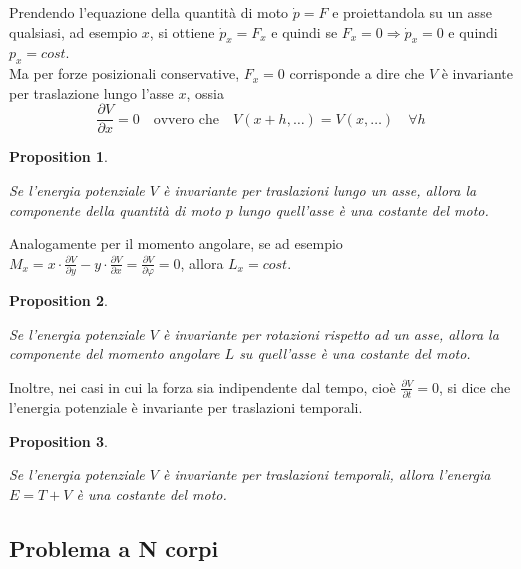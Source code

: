 \documentclass{article}
\newtheorem{proposition}{Proposition}[section]
\begin{document}
            Prendendo l'equazione della quantità di moto $\dot{p} = F$ e proiettandola su un asse qualsiasi, ad esempio $x$, si ottiene $\dot{p}_x = F_x$ e 
            quindi se $F_x = 0 \Longrightarrow \dot{p}_x = 0$ e quindi $p_x = cost$. \\
            Ma per forze posizionali conservative, $F_x = 0$ corrisponde a dire che $V$ è invariante per traslazione lungo l'asse $x$, ossia 
            \[ \frac{\partial V}{\partial x} = 0 \quad \textrm{ovvero che} \quad V(x + h, \dots) = V(x, \dots) \quad \forall h \]
            \begin{proposition}
                \label{prop:simmetrie e conservazioni}

                Se l'energia potenziale $V$ è invariante per traslazioni lungo un asse, allora la componente della quantità di moto $p$ lungo quell'asse è una costante del moto.

            \end{proposition}
            Analogamente per il momento angolare, se ad esempio $M_x = x \cdot \frac{\partial V}{\partial y} - y \cdot \frac{\partial V}{\partial x} = \frac{\partial V}{\partial \varphi} = 0 $, 
            allora $L_x = cost$.
            \begin{proposition}
                \label{prop:simmetrie e conservazioni 2}
                
                Se l'energia potenziale $V$ è invariante per rotazioni rispetto ad un asse, allora la componente del momento angolare $L$ su quell'asse è una costante del moto.
            \end{proposition}
            Inoltre, nei casi in cui la forza sia indipendente dal tempo, cioè $\frac{\partial V}{\partial t} = 0$, si dice che l'energia potenziale è invariante per traslazioni temporali.
            \begin{proposition}
                \label{prop:simmetrie e conservazioni 3}
                
                Se l'energia potenziale $V$ è invariante per traslazioni temporali, allora l'energia $E = T + V$ è una costante del moto.
            \end{proposition} 


        \subsection{Problema a N corpi}
            
\end{document}
